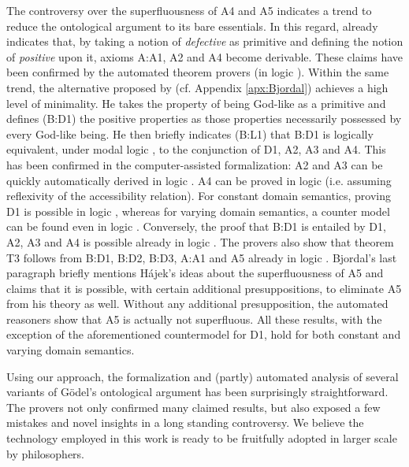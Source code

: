 \documentclass{birkjour}
\theoremstyle{definition}
\theoremstyle{remark}
\numberwithin{equation}{section}
\begin{document}
The controversy over the superfluousness of A4 and A5 indicates a trend to reduce the ontological argument to its bare essentials. In this regard, 
already \citet[p.~7]{anderson90:_some_emend_of_goedel_ontol_proof} indicates that, by taking a notion of \emph{defective} as primitive and defining the notion of \emph{positive} upon it, axioms A:A1, A2 and A4 become derivable. These claims have been confirmed by the automated theorem provers (in logic \KFourB). Within the same trend, the alternative proposed by \citet{bjordal99} (cf. Appendix \ref{apx:Bjordal}) achieves a high level of minimality. He takes the property of being God-like as a primitive and defines (B:D1) the positive properties as those properties necessarily possessed by every God-like being. He then briefly indicates (B:L1) that B:D1 is logically equivalent, under modal logic \SFour, to the conjunction of D1, A2, A3 and A4. This has been confirmed in the computer-assisted formalization: A2 and A3 can be quickly automatically derived in logic \K. A4 can be proved in logic \KT (i.e. assuming reflexivity of the accessibility relation). For constant domain semantics, proving D1 is possible in logic \KFour, whereas for varying domain semantics, a counter model can be found even in logic \SFive. Conversely, the proof that B:D1 is entailed by D1, A2, A3 and A4 is possible already in logic \K. The provers also show that theorem T3 follows from B:D1, B:D2, B:D3, A:A1 and A5 already in logic \KB. Bjordal's last paragraph briefly mentions Hájek's ideas about the superfluousness of A5 and claims that it is possible, with certain additional presuppositions, to eliminate A5 from his theory as well. Without any additional presupposition, the automated reasoners show that A5 is actually not superfluous. All these results, with the exception of the aforementioned countermodel for D1, hold for both constant and varying domain semantics.

Using our approach, the formalization and (partly) automated
analysis of several variants of G\"odel's ontological argument has been surprisingly
straightforward. The provers not only confirmed many claimed results, but also exposed a few mistakes and novel insights in a long standing controversy. 
We believe the technology employed in this work is ready to be 
fruitfully adopted in larger scale by philosophers.

\end{document}
